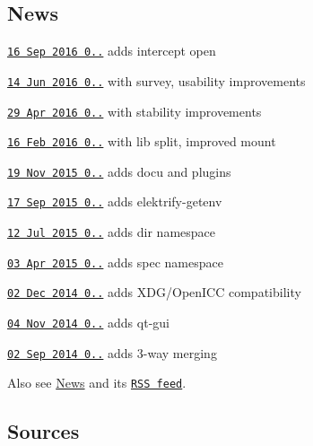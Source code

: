 \subsection*{News}


\begin{DoxyItemize}
\item \href{http://doc.libelektra.org/news/190576e0-9fef-486e-b8da-c4e75be08329.html}{\tt 16 Sep 2016 0..} adds intercept open
\item \href{http://doc.libelektra.org/news/e6153a39-c4bd-41c3-bc86-785d451eb6c5.html}{\tt 14 Jun 2016 0..} with survey, usability improvements
\item \href{http://doc.libelektra.org/news/9c9247ee-ee9c-4f4a-a68e-76959def9b82.html}{\tt 29 Apr 2016 0..} with stability improvements
\item \href{http://doc.libelektra.org/news/1ab4a560-c286-46d2-a058-1a8e7e208fe8.html}{\tt 16 Feb 2016 0..} with lib split, improved mount
\item \href{http://doc.libelektra.org/news/519cbfac-6db5-4594-8a38-dec4c84b134f.html}{\tt 19 Nov 2015 0..} adds docu and plugins
\item \href{http://doc.libelektra.org/news/3c00a5f1-c017-4555-92b5-a2cf6e0803e3.html}{\tt 17 Sep 2015 0..} adds elektrify-\/getenv
\item \href{http://doc.libelektra.org/news/98770541-32a1-486a-98a1-d02f26afc81a.html}{\tt 12 Jul 2015 0..} adds dir namespace
\item \href{http://doc.libelektra.org/news/7d4647d4-4131-411e-9c2a-2aca39446e18.html}{\tt 03 Apr 2015 0..} adds spec namespace
\item \href{http://doc.libelektra.org/news/6ce57ecf-420a-4a31-821e-1c5fe5532eb4.html}{\tt 02 Dec 2014 0..} adds X\+D\+G/\+Open\+I\+C\+C compatibility
\item \href{http://doc.libelektra.org/news/38640673-3e07-4cff-9647-f6bdd89b1b08.html}{\tt 04 Nov 2014 0..} adds qt-\/gui
\item \href{http://doc.libelektra.org/news/eca69e19-5ddb-438c-ac06-57c20b1a9160.html}{\tt 02 Sep 2014 0..} adds 3-\/way merging
\end{DoxyItemize}

Also see \hyperlink{doc_NEWS_md}{News} and its \href{http://www.libelektra.org/news/feed.rss}{\tt R\+S\+S feed}.

\subsection*{Sources}

